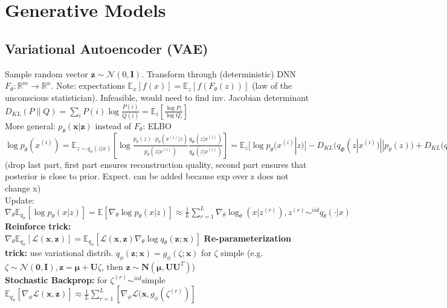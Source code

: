 \section{Generative Models}
\subsection*{Variational Autoencoder (VAE)}
Sample random vector $\mathbf{z} \sim \mathcal{N}(0,\mathbf{I})$. Transform through (deterministic) DNN $F_\theta : \mathbb{R}^m \to \mathbb{R}^n$. Note: expectations $\mathbb{E}_x[f(x)] = \mathbb{E}_z [f(F_\theta(z))]$ (law of the unconscious statistician). Infeasible, would need to find inv. Jacobian determinant\\
$D_{KL}(P\|Q)=\sum_i P(i)\log\frac{P(i)}{Q(i)}=\mathbb{E}_i [\frac{\log P_i}{\log Q_i}]$ \\
More general: $p_\theta (\mathbf{x}|\mathbf{z}) $ instead of $F_\theta$: ELBO \\
$\log p_\theta(x^{(i)})
= \mathbb{E}_{z \sim q_\phi (z|x)} \left[\log \frac{p_\theta(z) \cdot p_\theta(x^{(i)}|z)}{p_\theta(z|x^{(i)})}\frac{q_\Phi(z|x^{(i)})}{q_\Phi(z|x^{(i)})} \right] \allowbreak
= \mathbb{E}_z[\log p_\theta (x^{(i)}|z)] - D_{KL}(q_\Phi(z|x^{(i)}) || p_\theta(z)) + D_{KL}(q_\Phi(z|x^{(i)}) || p_\theta(z|x^{(i)})$ (drop last part, first part ensures reconstruction quality, second part ensures that posterior is close to prior. Expect. can be added because exp over z does not change x)\\
Update: $\nabla_\theta \mathbb{E}_{q_\phi}[\log p_\theta(x|z)] = \mathbb{E}[\nabla_\theta \log p_\theta(x|z)] \allowbreak \approx \frac 1 L \sum_{r=1}^L \nabla_\theta \log_\theta(x|z^{(r)}), z^{(r)} \sim^{iid} q_\theta (\cdot | x) $\\
\textbf{Reinforce trick:}\\ $\nabla_\theta\mathbb{E}_{q_\phi}[\mathcal{L}(\mathbf{x}, \mathbf{z})] = \mathbb{E}_{q_\phi}[\mathcal{L}(\mathbf{x}, \mathbf{z}) \nabla_\theta\log q_\theta(\mathbf{z};\mathbf{x})]$
\textbf{Re-parameterization trick:} use variational distrib. $q_\phi(\mathbf{z};\mathbf{x})=g_\phi(\zeta;\mathbf{x})$ for $\zeta$ simple (e.g. $\zeta \sim \mathcal{N}(\mathbf{0},\mathbf{I}), \mathbf{z}=\mathbf{\mu} + \mathbf{U}\zeta$, then $\mathbf{z}\sim \mathbf{N}(\mathbf{\mu}, \mathbf{UU}^T)$)\\
\textbf{Stochastic Backprop:} for $\zeta^{(r)} \sim^{iid} \text{simple}$ \\
$\mathbb{E}_{q_\phi}[\nabla_\phi\mathcal{L}(\mathbf{x}, \mathbf{z})] \approx \frac 1 L \sum_{r=1}^L [\nabla_\phi \mathcal{L}(\mathbf{x}, g_\phi(\zeta^{(r)})] $ 
